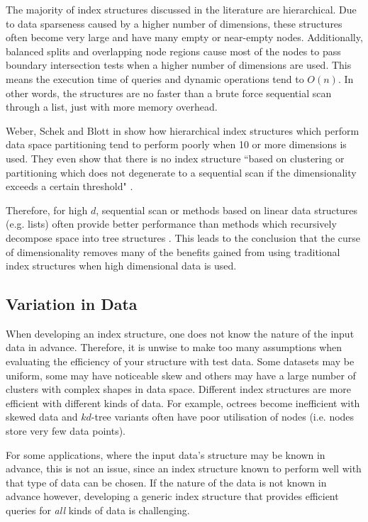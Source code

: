 The majority of index structures discussed in the literature are hierarchical. Due to data sparseness caused by a higher number of dimensions, these structures often become very large and have many empty or near-empty nodes. Additionally, balanced splits and overlapping node regions cause most of the nodes to pass boundary intersection tests when a higher number of dimensions are used. This means the execution time of queries and dynamic operations tend to $O(n)$. In other words, the structures are no faster than a brute force sequential scan through a list, just with more memory overhead.

Weber, Schek and Blott in \cite{va-file} show how hierarchical index structures which perform data space partitioning tend to perform poorly when 10 or more dimensions is used. They even show that there is no index structure ``based on clustering or partitioning which does not degenerate to a sequential scan if the dimensionality exceeds a certain threshold" \cite{va-file}.

Therefore, for high $d$, sequential scan or methods based on linear data structures (e.g. lists) often provide better performance than methods which recursively decompose space into tree structures \cite{md-structures-samet}. This leads to the conclusion that the curse of dimensionality removes many of the benefits gained from using traditional index structures when high dimensional data is used.

\subsection{Variation in Data}

When developing an index structure, one does not know the nature of the input data in advance. Therefore, it is unwise to make too many assumptions when evaluating the efficiency of your structure with test data. Some datasets may be uniform, some may have noticeable skew and others may have a large number of clusters with complex shapes in data space. Different index structures are more efficient with different kinds of data. For example, octrees become inefficient with skewed data and $kd$-tree variants often have poor utilisation of nodes \cite{bkd-tree} (i.e. nodes store very few data points).

For some applications, where the input data's structure may be known in advance, this is not an issue, since an index structure known to perform well with that type of data can be chosen. If the nature of the data is not known in advance however, developing a generic index structure that provides efficient queries for \textit{all} kinds of data is challenging.

